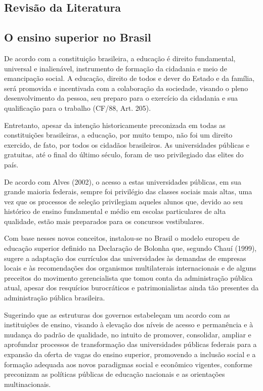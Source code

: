 
\subsection{Revisão da Literatura}


\subsection{O ensino superior no Brasil}

De acordo com a constituição brasileira, a educação é direito fundamental, universal e inalienável, instrumento de formação da cidadania e meio de emancipação social. A educação, direito de todos e dever do Estado e da família, será promovida e incentivada com a colaboração da sociedade, visando o pleno desenvolvimento da pessoa, seu preparo para o exercício da cidadania e sua qualificação para o trabalho (CF/88, Art. 205).

Entretanto, apesar da intenção historicamente preconizada em todas as constituições brasileiras, a educação, por muito tempo, não foi um direito exercido, de fato, por todos os cidadãos brasileiros. As universidades públicas e gratuitas, até o final do último século, foram de uso privilegiado das elites do país.

De acordo com Alves (2002), o acesso a estas universidades públicas, em sua grande maioria federais, sempre foi privilégio das classes sociais mais altas, uma vez que os processos de seleção privilegiam aqueles alunos que, devido ao seu histórico de ensino fundamental e médio em escolas particulares de alta qualidade, estão mais preparados para os concursos vestibulares.

Com base nesses novos conceitos, instalou-se no Brasil o modelo europeu de educação superior definido na Declaração de Bolonha que, segundo Chauí (1999), sugere a adaptação dos currículos das universidades às demandas de empresas locais e às recomendações dos organismos multilaterais internacionais e de alguns preceitos do movimento gerencialista que tomou conta da administração pública atual, apesar dos resquícios burocráticos e patrimonialistas ainda tão presentes da administração pública brasileira.

Sugerindo que as estruturas dos governos estabeleçam um acordo com as instituições de ensino, visando à elevação dos níveis de acesso e permanência e à mudança do padrão de qualidade, no intuito de promover, consolidar, ampliar e aprofundar processos de transformação das universidades públicas federais para a expansão da oferta de vagas do ensino superior, promovendo a inclusão social e a formação adequada aos novos paradigmas social e econômico vigentes, conforme preconizam as políticas públicas de educação nacionais e as orientações multinacionais.

